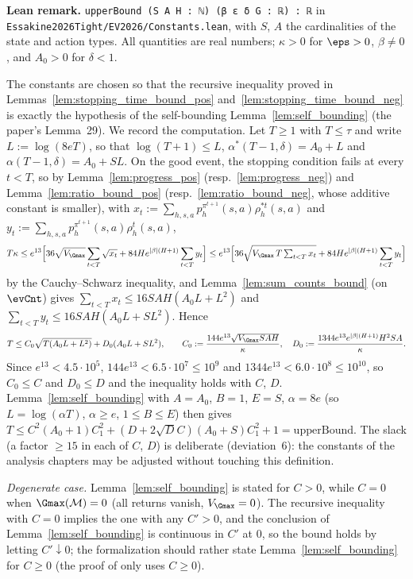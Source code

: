 \textbf{Lean remark.} \texttt{upperBound (S A H : ℕ) (β ε δ G : ℝ) : ℝ} in
\texttt{Essakine2026Tight/EV2026/Constants.lean}, with $S$, $A$ the cardinalities of the
state and action types. All quantities are real numbers; $\kappa > 0$ for $\eps > 0$, $\beta \ne 0$,
and $A_0 > 0$ for $\delta < 1$.

\begin{remark}\label{rem:sc_constants}
The constants are chosen so that the recursive inequality proved in
Lemmas~\ref{lem:stopping_time_bound_pos} and~\ref{lem:stopping_time_bound_neg} is exactly the
hypothesis of the self-bounding Lemma~\ref{lem:self_bounding} (the paper's Lemma~29). We
record the computation. Let $T \ge 1$ with $T \le \tau$ and write $L := \log(8eT)$, so that
$\log(T+1) \le L$, $\alpha^*(T-1,\delta) = A_0 + L$ and $\alpha(T-1,\delta) = A_0 + SL$. On the
good event, the stopping condition fails at every $t < T$, so by
Lemma~\ref{lem:progress_pos} (resp.~\ref{lem:progress_neg}) and
Lemma~\ref{lem:ratio_bound_pos} (resp.~\ref{lem:ratio_bound_neg}, whose additive constant is
smaller), with $x_t := \sum_{h,s,a} p^{\pi^{t+1}}_h(s,a)\rho^{*t}_h(s,a)$ and
$y_t := \sum_{h,s,a} p^{\pi^{t+1}}_h(s,a)\rho^t_h(s,a)$,
\[
  T\kappa \le e^{13}\Big[36\sqrt{V_{\Gmax}}\sum_{t<T}\sqrt{x_t} + 84 H e^{|\beta|(H+1)}\sum_{t<T} y_t\Big]
  \le e^{13}\Big[36\sqrt{V_{\Gmax}\, T \textstyle\sum_{t<T} x_t} + 84 H e^{|\beta|(H+1)}\sum_{t<T} y_t\Big]
\]
by the Cauchy--Schwarz inequality, and Lemma~\ref{lem:sum_counts_bound} (on $\evCnt$) gives
$\sum_{t<T} x_t \le 16 SAH(A_0 L + L^2)$ and $\sum_{t<T} y_t \le 16SAH(A_0 L + S L^2)$. Hence
\[
  T \le C_0\sqrt{T(A_0 L + L^2)} + D_0 (A_0 L + S L^2), \qquad
  C_0 := \frac{144 e^{13}\sqrt{V_{\Gmax} SAH}}{\kappa}, \quad
  D_0 := \frac{1344 e^{13} e^{|\beta|(H+1)} H^2 SA}{\kappa}.
\]
Since $e^{13} < 4.5\cdot 10^5$, $144 e^{13} < 6.5\cdot 10^7 \le 10^9$ and
$1344 e^{13} < 6.0\cdot 10^8 \le 10^{10}$, so $C_0 \le C$ and $D_0 \le D$ and the inequality holds
with $C$, $D$. Lemma~\ref{lem:self_bounding} with $A = A_0$, $B = 1$, $E = S$, $\alpha = 8e$
(so $L = \log(\alpha T)$, $\alpha \ge e$, $1 \le B \le E$) then gives
$T \le C^2(A_0 + 1)C_1^2 + (D + 2\sqrt D C)(A_0+S)C_1^2 + 1 = \mathrm{upperBound}$.
The slack (a factor $\ge 15$ in each of $C$, $D$) is deliberate (deviation~6): the constants of
the analysis chapters may be adjusted without touching this definition.

\emph{Degenerate case.} Lemma~\ref{lem:self_bounding} is stated for $C > 0$, while
$C = 0$ when $\Gmax(\mathcal M) = 0$ (all returns vanish, $V_{\Gmax} = 0$). The recursive
inequality with $C = 0$ implies the one with any $C' > 0$, and the conclusion of
Lemma~\ref{lem:self_bounding} is continuous in $C'$ at $0$, so the bound holds by letting
$C' \downarrow 0$; the formalization should rather state Lemma~\ref{lem:self_bounding} for
$C \ge 0$ (the proof of \cite[Lemma~13]{menard2021fast} only uses $C \ge 0$).


\end{remark}
